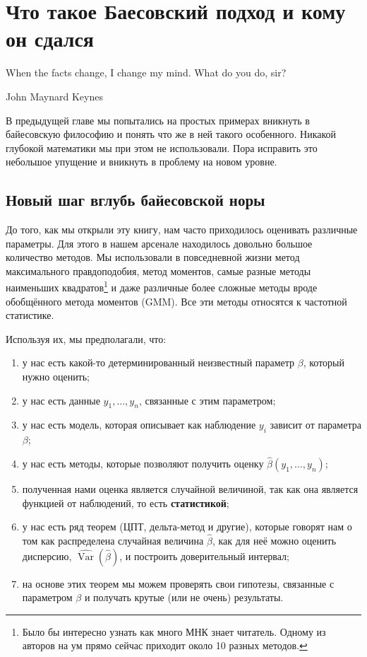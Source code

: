 \documentclass[12pt, a4paper, oneside]{extreport}
\DeclareMathOperator{\Var}{Var}
\def \hb{\hat{\beta}}
\def \hVar{\widehat{\Var}}
\newcommand{\indef}[1]{\textbf{#1}}     %
\theoremstyle{plain}              %
\theoremstyle{definition}         %
\begin{document}


\chapter{ Что такое Баесовский подход и кому он сдался }

\epigraph{When the facts change, I change my mind. What do you do, sir?}{John Maynard Keynes}


В предыдущей главе мы попытались на простых примерах вникнуть в байесовскую философию и понять что же в ней такого особенного. Никакой глубокой математики мы при этом не использовали. Пора исправить это небольшое упущение и вникнуть в проблему на новом уровне.

\section{Новый шаг вглубь байесовской норы}

До того, как мы открыли эту книгу, нам часто приходилось оценивать различные параметры. Для этого в нашем арсенале находилось довольно большое количество методов. Мы  использовали в повседневной жизни метод максимального правдоподобия, метод моментов, самые разные методы наименьших квадратов\footnote{Было бы интересно узнать как много МНК знает читатель. Одному из авторов на ум прямо сейчас приходит около 10 разных методов.} и даже различные более сложные методы вроде обобщённого метода моментов (GMM). Все эти методы относятся к частотной статистике.

Используя их, мы предполагали, что:

\begin{enumerate}
\item у нас есть какой-то детерминированный неизвестный параметр $\beta$, который нужно оценить;
\item у  нас есть данные $y_1, \ldots, y_n$, связанные с этим параметром;
\item у нас есть модель, которая описывает как наблюдение $y_i$ зависит от параметра $\beta$;
\item у нас есть методы, которые позволяют получить оценку $\hb(y_1, \ldots, y_n)$;
\item полученная нами оценка является случайной величиной, так как она является функцией от наблюдений, то есть \indef{статистикой};
\item у нас есть ряд теорем (ЦПТ, дельта-метод и другие), которые говорят нам о том как распределена случайная величина $\hb$, как для неё можно оценить дисперсию, $\hVar(\hb)$, и построить доверительный интервал;
\item на основе этих теорем мы можем проверять свои гипотезы, связанные с параметром $\beta$ и получать крутые (или не очень)  результаты. 
\end{enumerate}
\end{document}
